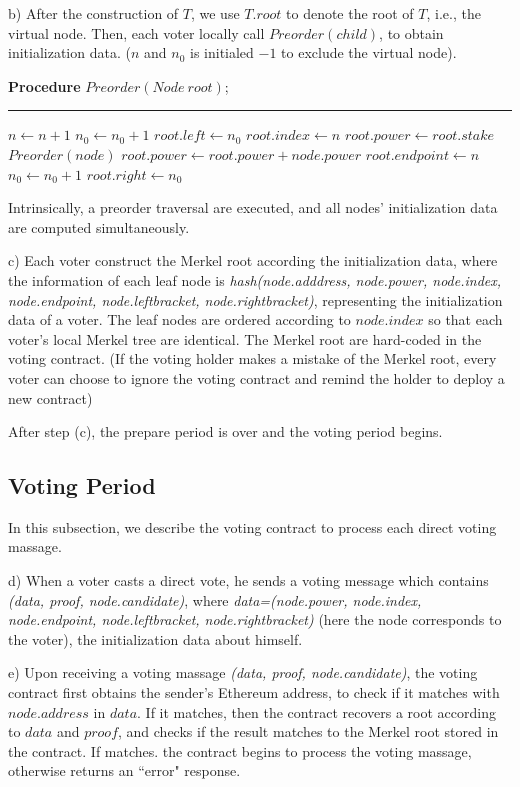 b) After the construction of $T$, we use $T.root$ to denote the root of $T$, i.e., the virtual node. Then, each voter locally call $Preorder(child)$, to obtain initialization data. ($n$ and $n_0$ is initialed $-1$ to exclude the virtual node).

\begin{algorithm}
	\label{alg:preorder}
	\textbf{Procedure} $Preorder(Node~root)$;
	\hrule
	$n \leftarrow n+1$\;
	$n_0 \leftarrow n_0+1$\;
	$root.left \leftarrow n_0$\;
	$root.index \leftarrow n$\;
	 $root.power \leftarrow root.stake$\;
	{
		$Preorder(node)$
		$root.power \leftarrow root.power+node.power$\;
	}
	$root.endpoint \leftarrow n$\;
	$n_0 \leftarrow n_0+1$\;
	$root.right \leftarrow n_0$\;
\end{algorithm}
Intrinsically, a preorder traversal are executed, and all nodes' initialization data are computed simultaneously. 

c) Each voter construct the Merkel root according the initialization data, where the information of each leaf node is {\em hash(node.adddress, node.power, node.index, node.endpoint, node.leftbracket, node.rightbracket)}, representing the initialization data of a voter. The leaf nodes are ordered according to $node.index$ so that each voter's local Merkel tree are identical. The  Merkel root are hard-coded in the voting contract. (If the voting holder makes a mistake of the Merkel root, every voter can choose to ignore the voting contract and remind the holder to deploy a new contract)

After step (c), the prepare period is over and the voting period begins.
\subsection{Voting Period}
In this subsection, we describe the voting contract to process each direct voting massage. 

d) When a voter casts a direct vote, he sends a voting message which contains {\em(data, proof, node.candidate)}, where {\em data=(node.power, node.index, node.endpoint, node.leftbracket, node.rightbracket)} (here the node corresponds to the voter), the initialization data about himself. 

e) Upon receiving a voting massage {\em(data, proof, node.candidate)}, the voting contract first obtains the sender's Ethereum address, to check if it matches with	 $node.address$ in $data$.   If it matches, then the contract recovers a root according to $data$ and $proof$, and checks if the result matches to the Merkel root stored in the contract. If matches. the contract begins to process the voting massage, otherwise returns an ``error" response.

